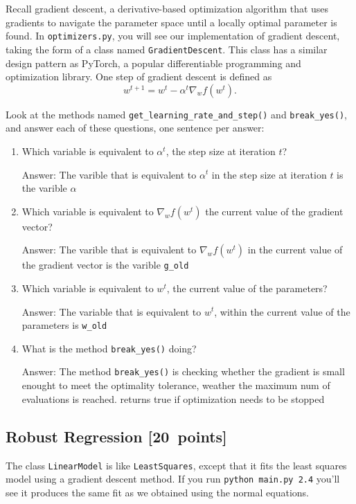 \documentclass{article}
\newcommand{\blu}[1]{{\textcolor{blu}{#1}}}
\newcommand{\gre}[1]{\textcolor{gre}{#1}}
\newcommand\ans[1]{\par\gre{Answer: #1}}
\let\ask\blu
\newcommand\pts[1]{\textcolor{pointscolour}{[#1~points]}}
\begin{document}
Recall gradient descent, a derivative-based optimization algorithm that uses gradients to navigate the parameter space until a locally optimal parameter is found. In \texttt{optimizers.py}, you will see our implementation of gradient descent, taking the form of a class named \texttt{GradientDescent}. This class has a similar design pattern as PyTorch, a popular differentiable programming and optimization library. One step of gradient descent is defined as
\[
	w^{t+1} = w^t - \alpha^t \nabla_w f(w^t)
.\]

Look at the methods named \texttt{get\_learning\_rate\_and\_step()} and \texttt{break\_yes()}, and \ask{answer each of these questions, one sentence per answer:}
\begin{enumerate}
	\item Which variable is equivalent to $\alpha^t$, the step size at iteration $t$?
	\ans{The varible that is equivalent to $\alpha^t$ in the step size at iteration $t$ is the varible $\alpha$}

	\item Which variable is equivalent to $\nabla_w f(w^t)$ the current value of the gradient vector?
	\ans{The varible that is equivalent to $\nabla_w f(w^t)$ in the current value of the gradient vector is the varible \texttt{g\_old}}

	\item Which variable is equivalent to $w^t$, the current value of the parameters?
	\ans{The variable that is equivalent to $w^t$, within the current value of the parameters is \texttt{w\_old}}

	\item What is the method \texttt{break\_yes()} doing?
	\ans{The method \texttt{break\_yes()} is checking whether the gradient is small enought to meet the optimality tolerance, weather the maximum num of evaluations is reached.
	returns true if optimization needs to be stopped}

\end{enumerate}


\subsection{Robust Regression \pts{20}}

The class \texttt{LinearModel} is like \texttt{LeastSquares}, except that it fits the least squares model using a gradient descent method. If you run \verb|python main.py 2.4| you'll see it produces the same fit as we obtained using the normal equations.
\end{document}
